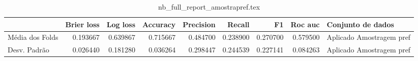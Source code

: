 \begin{table}
\centering
\caption{nb_full_report_amostrapref.tex}
\label{nb_full_report_amostrapref.tex}
\begin{tabular}{lrrrrrrrl}
\toprule
{}               &  Brier  loss &  Log loss &  Accuracy  &  Precision  &   Recall  &       F1  &  Roc auc  &         Conjunto de dados \\
\midrule
Média dos Folds &     0.193667 &  0.639867 &   0.715667 &    0.484700 &  0.238900 &  0.270700 &  0.579500 &  Aplicado Amostragem pref \\
Desv. Padrão    &     0.026440 &  0.181280 &   0.036264 &    0.298447 &  0.244539 &  0.227141 &  0.084263 &  Aplicado Amostragem pref \\
\bottomrule
\end{tabular}
\end{table}
